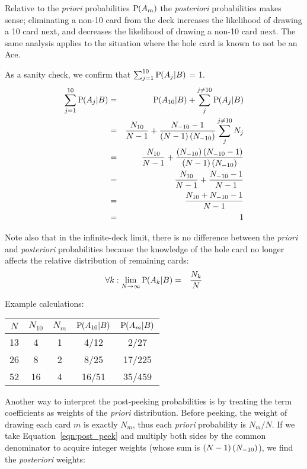 Relative to the \emph{priori} probabilities $\textrm{P}\hspace{-.5ex}\left(A_m\right)$ the
\emph{posteriori} probabilities makes sense;
eliminating a non-10 card from the deck increases the likelihood
of drawing a 10 card next, and decreases the likelihood of drawing
a non-10 card next.
The same analysis applies to the situation where the hole card
is known to not be an Ace.

As a sanity check, we confirm that $\sum_{j=1}^{10}{\textrm{P}\hspace{-.5ex}\left(A_j|B\right)}$ = 1.
\begin{eqnarray}
\sum_{j=1}^{10}{\textrm{P}\hspace{-.5ex}\left(A_j|B\right)} &=&
\textrm{P}\hspace{-.5ex}\left(A_{10}|B\right) +\sum_{j}^{j\neq{}10}{\textrm{P}\hspace{-.5ex}\left(A_j|B\right)}\\
&=& \frac{N_{10}}{N-1}
  +\frac{N_{-10}-1}{\left(N-1\right)\left(N_{-10}\right)} \sum_{j}^{j\neq{}10}{N_j} \label{eqn:post_peek} \\
&=& \frac{N_{10}}{N-1} +\frac{\left(N_{-10}\right)\left(N_{-10}-1\right)}{\left(N-1\right)\left(N_{-10}\right)}\\
&=& \frac{N_{10}}{N-1} +\frac{N_{-10}-1}{N-1}\\
&=& \frac{N_{10}+N_{-10}-1}{N-1}\\
&=& 1
\end{eqnarray}

Note also that in the infinite-deck limit, there is no difference
between the \emph{priori} and \emph{posteriori} probabilities because
the knowledge of the hole card no longer affects the relative distribution of 
remaining cards:
\begin{eqnarray}
\forall k: \lim_{N\rightarrow\infty}{\textrm{P}\hspace{-.5ex}\left(A_k|B\right)} &=& \frac{N_k}{N}
\end{eqnarray}

\noindent
Example calculations:
\begin{center}
\begin{tabular}{|c|c|c||c|c|}
\hline
$N$ & $N_{10}$ & $N_m$ & $\textrm{P}\hspace{-.5ex}\left(A_{10}|B\right)$ & $\textrm{P}\hspace{-.5ex}\left(A_m|B\right)$ \\ \hline \hline
13 & 4 & 1 & 4/12 & 2/27 \\ \hline
26 & 8 & 2 & 8/25 & 17/225 \\ \hline
52 & 16 & 4 & 16/51 & 35/459 \\ \hline
\end{tabular}
\end{center}

Another way to interpret the post-peeking probabilities is by treating 
the term coefficients as weights of the \emph{priori} distribution.
Before peeking, the weight of drawing each card $m$ is exactly
$N_m$, thus each \emph{priori} probability is $N_m/N$.
If we take Equation~\ref{eqn:post_peek} and multiply both sides
by the common denominator to acquire integer weights (whose sum is 
$\left(N-1\right)\left(N_{-10}\right)$), we find the \emph{posteriori} weights:

